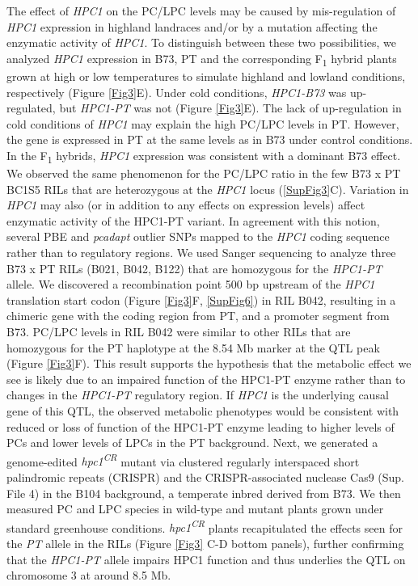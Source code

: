 \documentclass[9pt,twocolumn,twoside,lineno]{biorxiv}
\begin{document}
The effect of \textit{HPC1} on the PC/LPC levels may be caused by mis-regulation of \textit{HPC1} expression in highland landraces and/or by a mutation affecting the enzymatic activity of \textit{HPC1}. 
To distinguish between these two possibilities, we analyzed \textit{HPC1} expression in B73, PT and the corresponding F\textsubscript{1} hybrid plants grown at high or low temperatures to simulate highland and lowland conditions, respectively (Figure \ref{Fig3}E). 
Under cold conditions, \textit{HPC1-B73} was up-regulated, but \textit{HPC1-PT} was not (Figure \ref{Fig3}E). 
The lack of up-regulation in cold conditions of \textit{HPC1} may explain the high PC/LPC levels in PT.
However, the gene is expressed in PT at the same levels as in B73 under control conditions.
In the F\textsubscript{1} hybrids, \textit{HPC1} expression was consistent with a dominant B73 effect. 
We observed the same phenomenon for the PC/LPC ratio in the few B73 x PT BC1S5 RILs that are heterozygous at the \textit{HPC1} locus (\ref{SupFig3}C).
Variation in \textit{HPC1} may also (or in addition to any effects on expression levels) affect enzymatic activity of the HPC1-PT variant. In agreement with this notion, several PBE and \textit{pcadapt} outlier SNPs mapped to the \textit{HPC1} coding sequence rather than to regulatory regions. 
We used Sanger sequencing to analyze three B73 x PT RILs (B021, B042, B122) that are homozygous for the \textit{HPC1-PT} allele.
We discovered a recombination point 500 bp upstream of the \textit{HPC1} translation start codon (Figure \ref{Fig3}F, \ref{SupFig6}) in RIL B042, resulting in a chimeric gene with the coding region from PT, and a promoter segment from B73.
PC/LPC levels in RIL B042 were similar to other RILs that are homozygous for the PT haplotype at the 8.54 Mb marker at the QTL peak (Figure \ref{Fig3}F). 
This result supports the hypothesis that the metabolic effect we see is likely due to an impaired function of the HPC1-PT enzyme rather than to changes in the \textit{HPC1-PT} regulatory region.
If \textit{HPC1} is the underlying causal gene of this QTL, the observed metabolic phenotypes would be consistent with reduced or loss of function of the HPC1-PT enzyme leading to higher levels of PCs and lower levels of LPCs in the PT background. 
Next, we generated a genome-edited \textit{hpc1\textsuperscript{CR}} mutant via clustered regularly interspaced short palindromic repeats (CRISPR) and the CRISPR-associated nuclease Cas9 (Sup. File 4) in the B104 background, a temperate inbred derived from B73. 
We then measured PC and LPC species in wild-type and mutant plants grown under standard greenhouse conditions. 
\textit{hpc1\textsuperscript{CR}} plants recapitulated the effects seen for the \textit{PT} allele in the RILs (Figure \ref{Fig3} C-D bottom panels), further confirming that the \textit{HPC1-PT} allele impairs HPC1 function and thus underlies the QTL on chromosome 3 at around 8.5 Mb. 
\end{document}
